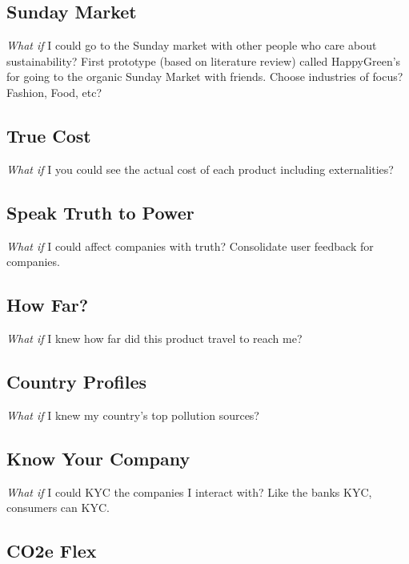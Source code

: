 \documentclass[
  letterpaper,
  DIV=11,
  numbers=noendperiod]{scrartcl}
\begin{document}
\subsection{Sunday Market}\label{sunday-market}

\emph{What if} I could go to the Sunday market with other people who
care about sustainability? First prototype (based on literature review)
called HappyGreen's for going to the organic Sunday Market with friends.
Choose industries of focus? Fashion, Food, etc?

\subsection{True Cost}\label{true-cost}

\emph{What if} I you could see the actual cost of each product including
externalities?

\subsection{Speak Truth to Power}\label{speak-truth-to-power}

\emph{What if} I could affect companies with truth? Consolidate user
feedback for companies.

\subsection{How Far?}\label{how-far}

\emph{What if} I knew how far did this product travel to reach me?

\subsection{Country Profiles}\label{country-profiles}

\emph{What if} I knew my country's top pollution sources?

\subsection{Know Your Company}\label{know-your-company}

\emph{What if} I could KYC the companies I interact with? Like the banks
KYC, consumers can KYC.

\subsection{CO2e Flex}\label{co2e-flex}
\end{document}
